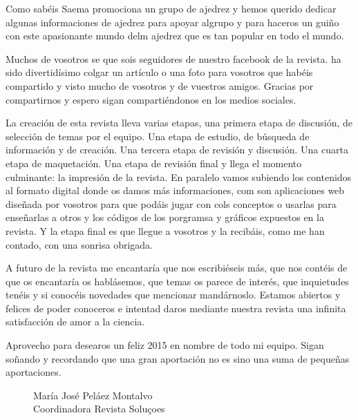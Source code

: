 \begin{multicols}{2}
Como sabéis Saema promociona un grupo de ajedrez y hemos querido dedicar algunas informaciones de ajedrez para apoyar algrupo y para haceros un guiño con este apasionante mundo delm ajedrez que es tan popular en todo el mundo.


Muchos de vosotros se que sois seguidores de nuestro facebook de la revista. ha sido divertidísimo colgar un artículo o una foto para vosotros que habéis compartido y visto mucho de vosotros y de vuestros amigos. Gracias por compartirnos y espero sigan compartiéndonos en los medios sociales.

La creación de esta revista lleva varias etapas, una primera etapa de discusión, de selección de temas por el equipo. Una etapa de estudio, de búsqueda de información y de creación. Una tercera etapa de revisión y discusión. Una cuarta etapa de maquetación. Una etapa de revisión final y llega el momento culminante: la impresión de la revista. En paralelo vamos subiendo los contenidos al formato digital donde os damos más informaciones, com son aplicaciones web diseñada por vosotros para que podáis jugar con cols conceptos o usarlas para enseñarlas a otros y los códigos de los porgramsa y gráficos expuestos en la revista. Y la etapa final es que llegue a vosotros y la recibáis, como me han contado, con una sonrisa obrigada.

A futuro de la revista me encantaría que nos escribiéseis más, que nos contéis de que os encantaría os hablásemos, que temas os parece de interés, que inquietudes tenéis y si conocéis novedades que mencionar mandárnoslo. Estamos abiertos y felices de poder conoceros e intentad daros mediante nuestra revista una infinita satisfacción de amor a la ciencia.

Aprovecho para desearos un feliz 2015 en nombre de todo mi equipo. Sigan soñando y recordando que una gran aportación no es sino una suma de pequeñas aportaciones. 

\begin{wrapfigure}{r}{0.40\textwidth} 
  \vspace{-21pt}
  \begin{figurebox}
   \vspace{20pt}
    \centering
    María José Peláez Montalvo\\ 
    {\small Coordinadora Revista Soluçoes}\\
    \vspace{1pt}
  \end{figurebox}
 \vspace{-20pt}
\end{wrapfigure}

\end{multicols}

\newpage


